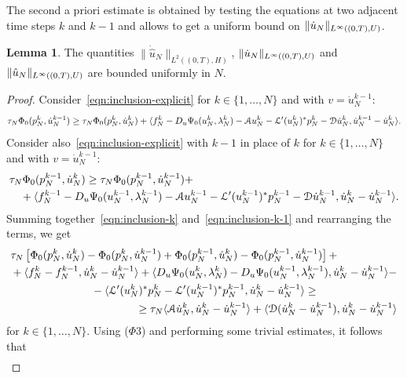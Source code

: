 \documentclass[a4paper,10pt,oneside]{amsbook}
\numberwithin{section}{chapter}
\numberwithin{equation}{chapter}
\theoremstyle{definition}
\newtheorem{lemma}[prop]{Lemma}
\DeclarePairedDelimiter{\norm}{\lVert}{\rVert}
\DeclarePairedDelimiter{\dual}{\langle}{\rangle}
\begin{document}
The second a priori estimate is obtained by testing the equations at two adjacent time steps $k$ and $k-1$ and allows to get a uniform bound on $\norm{\dot u_N}_{L^\infty((0,T),U)}$.
\begin{lemma}
The quantities
$\|\dot{\hat{u}}_N\|_{L^2((0,T),H)}$, $\norm{\dot u_N}_{L^\infty((0,T),U)}$ and $\norm{\hat u_N}_{L^\infty((0,T),U)}$ are bounded uniformly in $N$.
\end{lemma}
\begin{proof}
Consider~\eqref{eqn:inclusion-explicit} for $k\in\{1,\dots,N\}$ and with $v=\dot u_N^{k-1}$:
\begin{equation}
\label{eqn:inclusion-k}
\tau_N\Phi_0(p_N^k,\dot u_N^{k-1})\ge\tau_N\Phi_0(p_N^k,\dot u_N^k)+\dual{f_N^k-D_u\Psi_0(u_N^k,\lambda_N^k)-\mathcal{A}u_N^k-\mathcal{L}'(u_N^k)^*p_N^k-\mathcal{D}\dot u_N^k,\dot u_N^{k-1}-\dot u_N^k}.
\end{equation}
Consider also~\eqref{eqn:inclusion-explicit} with $k-1$ in place of $k$ for $k\in\{1,\dots,N\}$ and with $v=\dot u_N^{k-1}$:
\begin{equation}
\label{eqn:inclusion-k-1}
\begin{multlined}
\tau_N\Phi_0(p_N^{k-1},\dot u_N^k)\ge\tau_N\Phi_0(p_N^{k-1},\dot u_N^{k-1})+\\
+\dual{f_N^{k-1}-D_u\Psi_0(u_N^{k-1},\lambda_N^{k-1})-\mathcal{A}u_N^{k-1}-\mathcal{L}'(u_N^{k-1})^*p_N^{k-1}-\mathcal{D}\dot u_N^{k-1},\dot u_N^k-\dot u_N^{k-1}}.
\end{multlined}
\end{equation}
Summing together~\eqref{eqn:inclusion-k} and~\eqref{eqn:inclusion-k-1} and rearranging the terms, we get
\[
\begin{multlined}
\tau_N\left[\Phi_0(p_N^k,\dot u_N^k)-\Phi_0(p_N^k,\dot u_N^{k-1})+\Phi_0(p_N^{k-1},\dot u_N^k)-\Phi_0(p_N^{k-1},\dot u_N^{k-1})\right]+\\
+\dual{f_N^k-f_N^{k-1},\dot u_N^k-\dot u_N^{k-1}}+\dual{D_u\Psi_0(u_N^k,\lambda_N^k)-D_u\Psi_0(u_N^{k-1},\lambda_N^{k-1}),\dot u_N^k-\dot u_N^{k-1}}-\\
-\dual{\mathcal{L}'(u_N^k)^*p_N^k-\mathcal{L}'(u_N^{k-1})^*p_N^{k-1},\dot u_N^k-\dot u_N^{k-1}}\ge\\
\ge\tau_N\dual{\mathcal{A}\dot u_N^k,\dot u_N^k-\dot u_N^{k-1}}+\dual{\mathcal{D}(\dot u_N^k-\dot u_N^{k-1}),\dot u_N^k-\dot u_N^{k-1}}
\end{multlined}
\]
for $k\in\{1,\dots,N\}$. Using ($\Phi$3) and performing some trivial estimates, it follows that
\[
\begin{multlined}

\end{multlined}\]
\end{proof}
\end{document}

